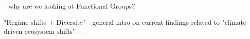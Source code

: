    
    - why are we looking at Functional Groups?
    
    "Regime shifts + Diversity" - general intro on current findings related to "climate driven ecosystem shifts"
        - %
        - 

